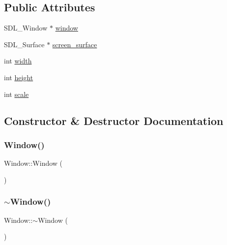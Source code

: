 \subsection*{Public Attributes}
\begin{DoxyCompactItemize}
\item 
S\+D\+L\+\_\+\+Window $\ast$ \mbox{\hyperlink{class_window_ae39a7755a5a6ab74bcbdbe3e2e206820}{window}}
\item 
S\+D\+L\+\_\+\+Surface $\ast$ \mbox{\hyperlink{class_window_a713df53f14819f78c3845d9313b27064}{screen\+\_\+surface}}
\item 
int \mbox{\hyperlink{class_window_af5b1c436782cc9752d386493fbc5dc8c}{width}}
\item 
int \mbox{\hyperlink{class_window_af0ac1732ca6b79a6f6b78aa344140514}{height}}
\item 
int \mbox{\hyperlink{class_window_a4fef6f02971f830ca788fec46392f87c}{scale}}
\end{DoxyCompactItemize}


\subsection{Constructor \& Destructor Documentation}
\mbox{\label{class_window_a74e6087da23d3c24e9fac0245e5ec92c}} 
\subsubsection{\texorpdfstring{Window()}{Window()}}
{\footnotesize\ttfamily Window\+::\+Window (\begin{DoxyParamCaption}{ }\end{DoxyParamCaption})}

\mbox{\label{class_window_a245d821e6016fa1f6970ccbbedd635f6}} 
\subsubsection{\texorpdfstring{$\sim$Window()}{~Window()}}
{\footnotesize\ttfamily Window\+::$\sim$\+Window (\begin{DoxyParamCaption}{ }\end{DoxyParamCaption})\hspace{0.3cm}{\ttfamily [virtual]}}



